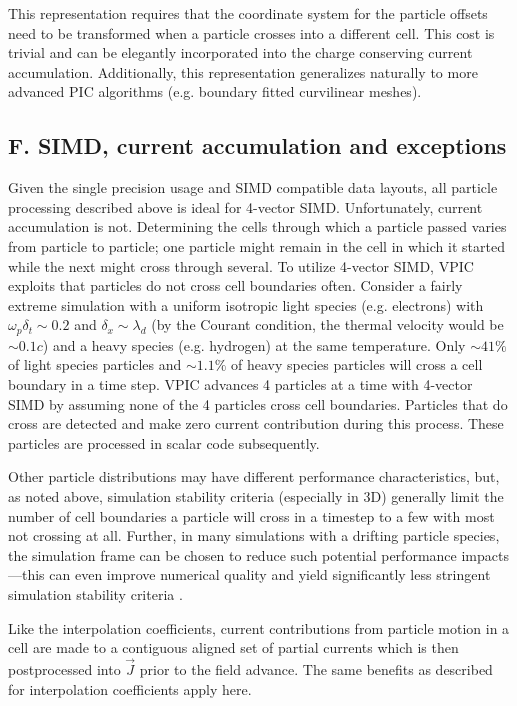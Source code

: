 \documentclass[letter,10pt]{article}
\newcommand{\vecJ}{\vec{J}}
\begin{document}
This representation requires that the coordinate system for the
particle offsets need to be transformed when a particle crosses into a
different cell.  This cost is trivial and can be elegantly
incorporated into the charge conserving current accumulation.
Additionally, this representation generalizes naturally to more
advanced PIC algorithms (e.g. boundary fitted curvilinear meshes).

\subsection{F. SIMD, current accumulation and exceptions}

Given the single precision usage and SIMD compatible data layouts, all
particle processing described above is ideal for 4-vector SIMD.
Unfortunately, current accumulation is not.  Determining the cells
through which a particle passed varies from particle to particle; one
particle might remain in the cell in which it started while the next
might cross through several.  To utilize 4-vector SIMD, VPIC exploits
that particles do not cross cell boundaries often.  Consider a fairly
extreme simulation with a uniform isotropic light species
(e.g. electrons) with $\omega_p \delta_t \sim 0.2$ and $\delta_x \sim
\lambda_d$ (by the Courant condition, the thermal velocity would be
$\sim 0.1c$) and a heavy species (e.g. hydrogen) at the same
temperature.  Only $\sim 41\%$ of light species particles and $\sim
1.1\%$ of heavy species particles will cross a cell boundary in a time
step.  VPIC advances 4 particles at a time with 4-vector SIMD by
assuming none of the 4 particles cross cell boundaries.  Particles
that do cross are detected and make zero current contribution during
this process.  These particles are processed in scalar code
subsequently.

Other particle distributions may have different performance
characteristics, but, as noted above, simulation stability criteria
(especially in 3D) generally limit the number of cell boundaries a
particle will cross in a timestep to a few with most not crossing at
all.  Further, in many simulations with a drifting particle species,
the simulation frame can be chosen to reduce such potential
performance impacts---this can even improve numerical quality and
yield significantly less stringent simulation stability criteria
\cite{Vay_2007}.

Like the interpolation coefficients, current contributions from
particle motion in a cell are made to a contiguous aligned set of
partial currents which is then postprocessed into $\vecJ$ prior to the
field advance.  The same benefits as described for interpolation
coefficients apply here.
\end{document}
